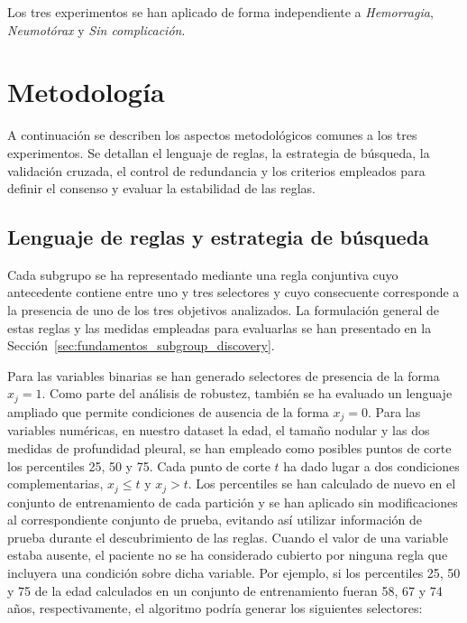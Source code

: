 Los tres experimentos se han aplicado de forma independiente a \textit{Hemorragia}, \textit{Neumotórax} y \textit{Sin complicación}.


\section{Metodología}

A continuación se describen los aspectos metodológicos comunes a los tres experimentos. Se detallan el lenguaje de reglas, la estrategia de búsqueda, la validación cruzada, el control de redundancia y los criterios empleados para definir el consenso y evaluar la estabilidad de las reglas.

\subsection{Lenguaje de reglas y estrategia de búsqueda}

Cada subgrupo se ha representado mediante una regla conjuntiva cuyo antecedente contiene entre uno y tres selectores y cuyo consecuente corresponde a la presencia de uno de los tres objetivos analizados. La formulación general de estas reglas y las medidas empleadas para evaluarlas se han presentado en la Sección~\ref{sec:fundamentos_subgroup_discovery}.

Para las variables binarias se han generado selectores de presencia de la forma \(x_j=1\). Como parte del análisis de robustez, también se ha evaluado un lenguaje ampliado que permite condiciones de ausencia de la forma \(x_j=0\). Para las variables numéricas, en nuestro dataset la edad, el tamaño nodular y las dos medidas de profundidad pleural, se han empleado como posibles puntos de corte los percentiles 25, 50 y 75. Cada punto de corte \(t\) ha dado lugar a dos condiciones complementarias, \(x_j \leq t\) y \(x_j > t\). Los percentiles se han calculado de nuevo en el conjunto de entrenamiento de cada partición y se han aplicado sin modificaciones al correspondiente conjunto de prueba, evitando así utilizar información de prueba durante el descubrimiento de las reglas. Cuando el valor de una variable estaba ausente, el paciente no se ha considerado cubierto por ninguna regla que incluyera una condición sobre dicha variable. Por ejemplo, si los percentiles 25, 50 y 75 de la edad calculados en un conjunto de entrenamiento fueran 58, 67 y 74 años, respectivamente, el algoritmo podría generar los siguientes selectores:

